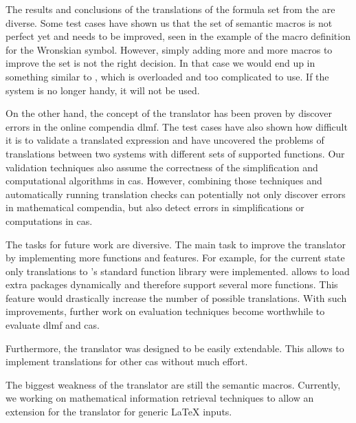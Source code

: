 The results and conclusions of the translations of the formula set from the \DLMF{} are diverse. Some test cases have shown us that the set of semantic macros is not perfect yet and needs to be improved, seen in the example of the macro definition for the Wronskian symbol. However, simply adding more and more macros to improve the set is not the right decision. In that case we would end up in something similar to \sTeX, which is overloaded and too complicated to use. If the system is no longer handy, it will not be used.

On the other hand, the concept of the translator has been proven by discover errors in the online compendia \gls*{dlmf}. The test cases have also shown how difficult it is to validate a translated expression and have uncovered the problems of translations between two systems with different sets of supported functions. Our validation techniques also assume the correctness of the simplification and computational algorithms in \gls{cas}. However, combining those techniques and automatically running translation checks can potentially not only discover errors in mathematical compendia, but also detect errors in simplifications or computations in \gls{cas}.

The tasks for future work are diversive. The main task to improve the translator by implementing more functions and features. For example, for the current state only translations to \Maple's standard function library were implemented. \Maple{} allows to load extra packages dynamically and therefore support several more functions. This feature would drastically increase the number of possible translations. With such improvements, further work on evaluation techniques become worthwhile to evaluate \gls*{dlmf} and \gls*{cas}.

Furthermore, the translator was designed to be easily extendable. This allows to implement translations for other \gls*{cas} without much effort.

The biggest weakness of the translator are still the semantic macros. Currently, we working on mathematical information retrieval techniques to allow an extension for the translator for generic \LaTeX{} inputs.

